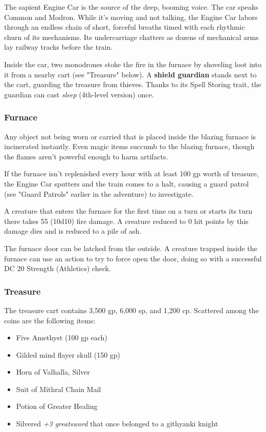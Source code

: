 \documentclass[10pt,a4paper,twoside,bg=print,twocolumn,openany,nodeprecatedcode]{dndarticle}
\begin{document}
The sapient Engine Car is the source of the deep, booming voice. The car speaks Common and Modron. While it's moving and not talking, the Engine Car labors through an endless chain of short, forceful breaths timed with each rhythmic churn of its mechanisms. Its undercarriage chatters as dozens of mechanical arms lay railway tracks before the train.

Inside the car, two monodrones stoke the fire in the furnace by shoveling loot into it from a nearby cart (see "Treasure" below). A \textbf{shield guardian} stands next to the cart, guarding the treasure from thieves. Thanks to its Spell Storing trait, the guardian can cast \textit{sleep} (4th-level version) once.

\subsubsection{Furnace}
Any object not being worn or carried that is placed inside the blazing furnace is incinerated instantly. Even magic items succumb to the blazing furnace, though the flames aren't powerful enough to harm artifacts.

If the furnace isn't replenished every hour with at least 100 gp worth of treasure, the Engine Car sputters and the train comes to a halt, causing a guard patrol (see "Guard Patrols" earlier in the adventure) to investigate.

A creature that enters the furnace for the first time on a turn or starts its turn there takes 55 (10d10) fire damage. A creature reduced to 0 hit points by this damage dies and is reduced to a pile of ash.

The furnace door can be latched from the outside. A creature trapped inside the furnace can use an action to try to force open the door, doing so with a successful DC 20 Strength (Athletics) check.

\subsubsection{Treasure}
The treasure cart contains 3,500 gp, 6,000 sp, and 1,200 cp. Scattered among the coins are the following items:


\begin{itemize}
\item Five Amethyst (100 gp each)
\item Gilded mind flayer skull (150 gp)
\item Horn of Valhalla, Silver
\item Suit of Mithral Chain Mail
\item Potion of Greater Healing
\item Silvered \textit{+3 greatsword} that once belonged to a githyanki knight
\end{itemize}
\end{document}
